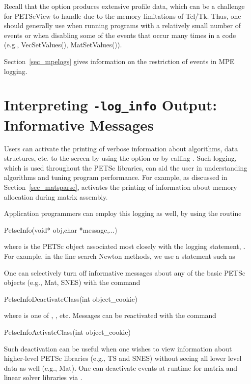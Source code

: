 {{Recall that the option  produces extensive profile
data, which can be a challenge for PETScView to handle due to
the memory limitations of Tcl/Tk.  Thus, one should generally use
 when running programs with a relatively small
number of events or when disabling some of the events that occur many
times in a code (e.g., VecSetValues(), MatSetValues()).

Section~\ref{sec_mpelogs} gives information on the restriction of events
in MPE logging.


\section{Interpreting {\tt -log\_info} Output: Informative Messages}
\label{sec_PetscLoginfo}

Users can activate the printing of verbose information about
algorithms, data structures, etc. to the screen by using the option   or by calling . 
Such logging, which is used throughout the PETSc libraries,
can aid the user in understanding algorithms and 
tuning program performance.  For example, as discussed in
Section~\ref{sec_matsparse},  activates the
printing of information about memory allocation during
matrix assembly.

Application programmers can employ this logging as well, by
using the routine 
\begin{tabbing}
   PetscInfo(void* obj,char *message,...)
\end{tabbing}
where  is the PETSc object associated most closely with
the logging statement, .
For example, in the line search Newton methods, we use a statement such as

One can selectively turn off informative messages about any of the 
basic PETSc objects (e.g., Mat, SNES) with the command
\begin{tabbing}
   PetscInfoDeactivateClass(int object\_cookie)
\end{tabbing}
where  
 is one of , , etc.
Messages can be reactivated with the command
\begin{tabbing}
   PetscInfoActivateClass(int object\_cookie)
\end{tabbing}
Such deactivation can be useful when one wishes to view information
about higher-level PETSc libraries (e.g., TS and SNES) without 
seeing all lower level data as well (e.g., Mat).  One can deactivate
events at runtime for matrix and linear solver libraries via .

}}
